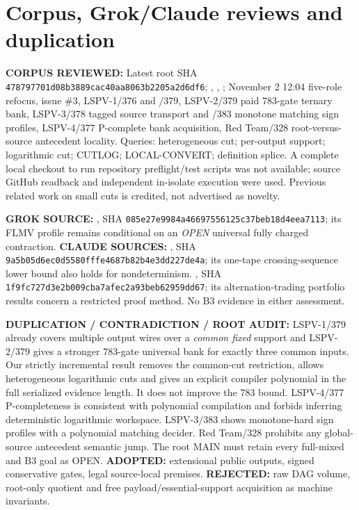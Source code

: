 \documentclass[11pt]{article}
\begin{document}
\section*{Corpus, Grok/Claude reviews and duplication}
\noindent\textbf{CORPUS REVIEWED:} Latest root  SHA \texttt{478797701d08b3889cac40aa8063b2205a2d6df6}; , , ; November 2 12:04 five-role refocus, issue \#3, LSPV-1/376 and /379, LSPV-2/379 paid 783-gate ternary bank, LSPV-3/378 tagged source transport and /383 monotone matching sign profiles, LSPV-4/377 P-complete bank acquisition, Red Team/328 root-versus-source antecedent locality. Queries: heterogeneous cut; per-output support; logarithmic cut; CUTLOG; LOCAL-CONVERT; definition splice. A complete local checkout to run repository preflight/test scripts was not available; source GitHub readback and independent in-isolate execution were used. Previous related work on small cuts is credited, not advertised as novelty.

\noindent\textbf{GROK SOURCE:} , SHA \texttt{085e27e9984a46697556125c37beb18d4eea7113}; its FLMV profile remains conditional on an \emph{OPEN} universal fully charged contraction. \textbf{CLAUDE SOURCES:} , SHA \texttt{9a5b05d6ec0d5580fffe4687b82b4e3dd227de4a}; its one-tape crossing-sequence lower bound also holds for nondeterminism. , SHA \texttt{1f9fc727d3e2b009cba7afec2a93beb62959dd67}; its alternation-trading portfolio results concern a restricted proof method. No B3 evidence in either assessment.

\noindent\textbf{DUPLICATION / CONTRADICTION / ROOT AUDIT:} LSPV-1/379 already covers multiple output wires over a \emph{common fixed} support and LSPV-2/379 gives a stronger 783-gate universal bank for exactly three common inputs. Our strictly incremental result removes the common-cut restriction, allows heterogeneous logarithmic cuts and gives an explicit compiler polynomial in the full serialized evidence length. It does not improve the 783 bound. LSPV-4/377 P-completeness is consistent with polynomial compilation and forbids inferring deterministic logarithmic workspace. LSPV-3/383 shows monotone-hard sign profiles with a polynomial matching decider. Red Team/328 prohibits any global-source antecedent semantic jump. The root MAIN must retain every full-mixed and B3 goal as OPEN. \textbf{ADOPTED:} extensional public outputs, signed conservative gates, legal source-local premises. \textbf{REJECTED:} raw DAG volume, root-only quotient and free payload/essential-support acquisition as machine invariants.
\end{document}
